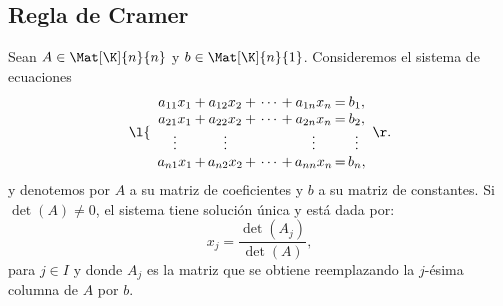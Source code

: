 \documentclass[compacto,10pt]{pubciencias-notas}
\begin{document}
\subsection{Regla de Cramer}
\begin{teo}
    Sean $A\in\Mat[\K]{n}{n}$ y $b\in\Mat[\K]{n}{1}$. Consideremos el sistema de ecuaciones
    \[
        \l\{
        \begin{array}{c@{\,}c@{\,}c@{\,}c@{\,}c@{\,}c@{\,}c}
        a_{11} x_1 & + & a_{12} x_2 & + \, \cdots \, + & a_{1n} x_n & = & b_1, \\
        a_{21} x_1 & + & a_{22} x_2 & + \, \cdots \, + & a_{2n} x_n & = & b_2, \\
        \vdots &    &     \vdots & & \vdots & &  \vdots \\
        a_{n1} x_1 & + & a_{n2} x_2 & + \, \cdots \, + & a_{nn} x_n & = & b_n, \\
        \end{array}
        \r.
    \]
    y denotemos por $A$ a su matriz de coeficientes y $b$ a su matriz de constantes. Si $\det(A) \neq 0$, el sistema tiene solución única y está dada por:
    \[
        x_j = \dfrac{\det(A_j)}{\det(A)},
    \]
    para $j\in I$ y donde $A_j$ es la matriz que se obtiene reemplazando la $j$-ésima columna de $A$ por $b$.
\end{teo}
\end{document}
